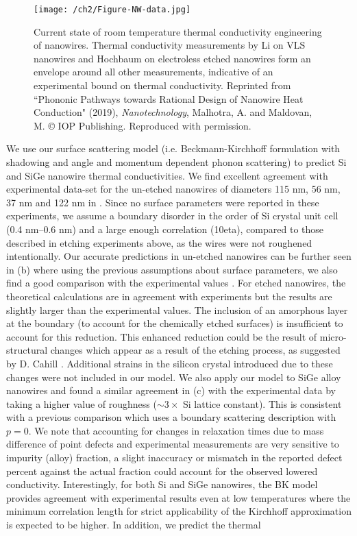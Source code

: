 \begin{figure}[hbt]
	\texttt{[image: /ch2/Figure-NW-data.jpg]}
	\caption{Current state of room temperature thermal conductivity engineering of nanowires. Thermal conductivity measurements by Li \etal \cite{RN20} on VLS nanowires and Hochbaum \etal \cite{NW_hochbaum} on electroless etched nanowires form an envelope around all other measurements, indicative of an experimental bound on thermal conductivity. Reprinted from ``Phononic Pathways towards Rational Design of Nanowire Heat Conduction" (2019), \textit{Nanotechnology}, Malhotra, A. and Maldovan, M. © IOP Publishing. Reproduced with permission.}
	\label{fig:ch2-nwdatadump}
\end{figure}
We use our surface scattering model (i.e. Beckmann-Kirchhoff formulation with shadowing and angle and momentum dependent phonon scattering) to predict Si and SiGe nanowire thermal conductivities. We find excellent agreement with experimental data-set for the un-etched nanowires of diameters 115 nm, 56 nm, 37 nm \cite{RN20} and 122 nm \cite{RN111} in . Since no surface parameters were reported in these experiments, we assume a boundary disorder in the order of Si crystal unit cell (0.4 nm–0.6 nm) and a large enough correlation (10\gls{eta}), compared to those described in etching experiments above, as the wires were not roughened intentionally. Our accurate predictions in un-etched nanowires can be further seen in (b) where using the previous assumptions about surface parameters, we also find a good comparison with the experimental values \cite{RN131}. For etched nanowires, the theoretical calculations are in agreement with experiments \cite{RN131,RN130} but the results are slightly larger than the experimental values. The inclusion of an amorphous layer \cite{RN103,RN240} at the boundary (to account for the chemically etched surfaces) is insufficient to account for this reduction. This enhanced reduction could be the result of micro-structural changes which appear as a result of the etching process, as suggested by D. Cahill \cite{RN67}. Additional strains in the silicon crystal introduced due to these changes were not included in our model. We also apply our model to SiGe alloy nanowires and found a similar agreement in (c) with the experimental data by taking a higher value of roughness ($\sim 3\times$ Si lattice constant). This is consistent with a previous comparison \cite{RN289} which uses a boundary scattering description with $p = 0$. We note that accounting for changes in relaxation times due to mass difference of point defects \cite{RN289,RN132} and experimental measurements \cite{RN111,RN520} are very sensitive to impurity (alloy) fraction, a slight inaccuracy or mismatch in the reported defect percent against the actual fraction could account for the observed lowered conductivity. Interestingly, for both Si and SiGe nanowires, the BK model provides agreement with experimental results even at low temperatures where the minimum correlation length for strict applicability of the Kirchhoff approximation is expected to be higher. In addition, we predict the thermal 